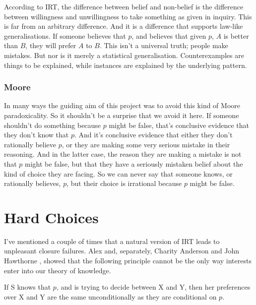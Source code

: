 \documentclass[11pt,]{book}
\providecommand{\tightlist}{%
  \setlength{\itemsep}{0pt}\setlength{\parskip}{0pt}}
\begin{document}
According to IRT, the difference between belief and non-belief is the difference between willingness and unwillingness to take something as given in inquiry. This is far from an arbitrary difference. And it is a difference that supports law-like generalisations. If someone believes that \(p\), and believes that given \(p\), \(A\) is better than \(B\), they will prefer \(A\) to \(B\). This isn't a universal truth; people make mistakes. But nor is it merely a statistical generalisation. Counterexamples are things to be explained, while instances are explained by the underlying pattern.

\hypertarget{moore}{%
\subsection{Moore}\label{moore}}

In many ways the guiding aim of this project was to avoid this kind of Moore paradoxicality. So it shouldn't be a surprise that we avoid it here. If someone shouldn't do something because \(p\) might be false, that's conclusive evidence that they don't know that \(p\). And it's conclusive evidence that either they don't rationally believe \(p\), or they are making some very serious mistake in their reasoning. And in the latter case, the reason they are making a mistake is not that \(p\) might be false, but that they have a seriously mistaken belief about the kind of choice they are facing. So we can never say that someone knows, or rationally believes, \(p\), but their choice is irrational because \(p\) might be false.

\hypertarget{ties}{%
\chapter{Hard Choices}\label{ties}}

I've mentioned a couple of times that a natural version of IRT leads to unpleasant closure failures. Alex \citet{Zweber2016} and, separately, Charity Anderson and John Hawthorne \citeyearpar{AndersonHawthorne2019a}, showed that the following principle cannot be the only way interests enter into our theory of knowledge.

\begin{description}
\tightlist
\item[Conditional Preferences]
If S knows that \(p\), and is trying to decide between X and Y, then her preferences over X and Y are the same unconditionally as they are conditional on \(p\).
\end{description}
\end{document}
